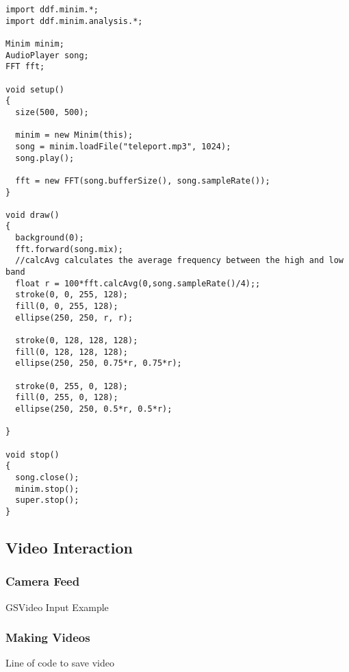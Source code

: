 \begin{verbatim}
import ddf.minim.*;
import ddf.minim.analysis.*;
 
Minim minim;
AudioPlayer song;
FFT fft;
 
void setup()
{
  size(500, 500);
 
  minim = new Minim(this);
  song = minim.loadFile("teleport.mp3", 1024);
  song.play();

  fft = new FFT(song.bufferSize(), song.sampleRate());
}
 
void draw()
{
  background(0);
  fft.forward(song.mix);
  //calcAvg calculates the average frequency between the high and low band
  float r = 100*fft.calcAvg(0,song.sampleRate()/4);;
  stroke(0, 0, 255, 128); 
  fill(0, 0, 255, 128);
  ellipse(250, 250, r, r);

  stroke(0, 128, 128, 128); 
  fill(0, 128, 128, 128);
  ellipse(250, 250, 0.75*r, 0.75*r);
  
  stroke(0, 255, 0, 128); 
  fill(0, 255, 0, 128);
  ellipse(250, 250, 0.5*r, 0.5*r);

}
 
void stop()
{
  song.close();
  minim.stop();
  super.stop();
}
\end{verbatim}

\subsection{Video Interaction}
\subsubsection{Camera Feed}
GSVideo Input Example
\subsubsection{Making Videos}
Line of code to save video

